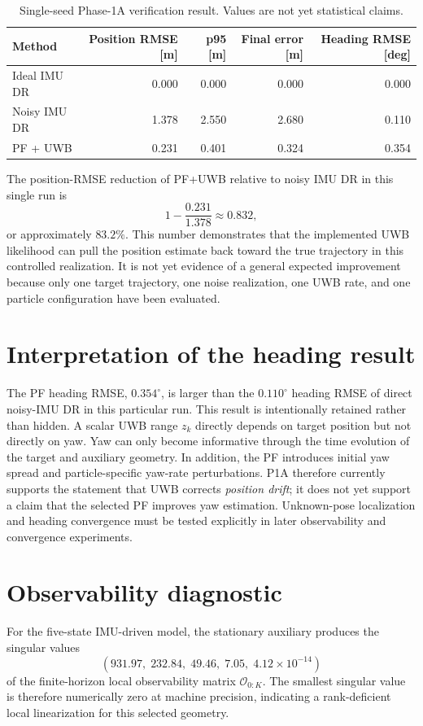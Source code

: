 \begin{table}[ht]
\centering
\caption{Single-seed Phase-1A verification result. Values are not yet statistical claims.}
\label{tab:p1results}
\begin{tabular}{lrrrr}
\toprule
Method & Position RMSE [m] & p95 [m] & Final error [m] & Heading RMSE [deg]\\
\midrule
Ideal IMU DR & 0.000 & 0.000 & 0.000 & 0.000\\
Noisy IMU DR & 1.378 & 2.550 & 2.680 & 0.110\\
PF + UWB & 0.231 & 0.401 & 0.324 & 0.354\\
\bottomrule
\end{tabular}
\end{table}

The position-RMSE reduction of PF+UWB relative to noisy IMU DR in this single run is
\begin{equation}
1-\frac{0.231}{1.378}\approx 0.832,
\end{equation}
or approximately $83.2\%$. This number demonstrates that the implemented UWB likelihood can pull the position estimate back toward the true trajectory in this controlled realization. It is not yet evidence of a general expected improvement because only one target trajectory, one noise realization, one UWB rate, and one particle configuration have been evaluated.

\section{Interpretation of the heading result}
The PF heading RMSE, $0.354^\circ$, is larger than the $0.110^\circ$ heading RMSE of direct noisy-IMU DR in this particular run. This result is intentionally retained rather than hidden. A scalar UWB range $z_k$ directly depends on target position but not directly on yaw. Yaw can only become informative through the time evolution of the target and auxiliary geometry. In addition, the PF introduces initial yaw spread and particle-specific yaw-rate perturbations. P1A therefore currently supports the statement that UWB corrects \emph{position drift}; it does not yet support a claim that the selected PF improves yaw estimation. Unknown-pose localization and heading convergence must be tested explicitly in later observability and convergence experiments.

\section{Observability diagnostic}
For the five-state IMU-driven model, the stationary auxiliary produces the singular values
\begin{equation}
(931.97,\;232.84,\;49.46,\;7.05,\;4.12\times10^{-14})
\end{equation}
of the finite-horizon local observability matrix $\mathcal{O}_{0:K}$. The smallest singular value is therefore numerically zero at machine precision, indicating a rank-deficient local linearization for this selected geometry.

